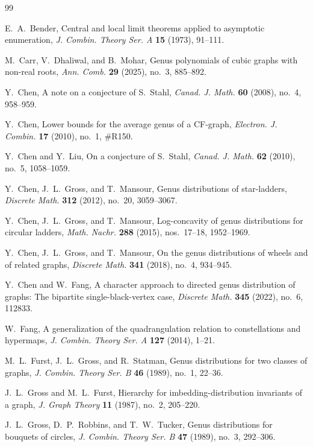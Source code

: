\documentclass[12pt]{article}
\theoremstyle{definition}
\begin{document}
\begin{thebibliography}{99}
\frenchspacing

E.~A.~Bender,
Central and local limit theorems applied to asymptotic enumeration,
\emph{J. Combin. Theory Ser. A} \textbf{15} (1973),  91--111.

M.~Carr, V.~Dhaliwal, and B.~Mohar,
Genus polynomials of cubic graphs with non-real roots,
\emph{Ann. Comb.} \textbf{29} (2025), no.~3, 885--892.

Y.~Chen,
A note on a conjecture of S.~Stahl,
\emph{Canad. J. Math.} \textbf{60} (2008), no.~4, 958--959.

Y.~Chen,
Lower bounds for the average genus of a CF-graph,
\emph{Electron. J. Combin.} \textbf{17} (2010), no.~1, \#R150.

Y.~Chen and Y.~Liu,
On a conjecture of S.~Stahl,
\emph{Canad. J. Math.} \textbf{62} (2010), no.~5, 1058--1059.

Y.~Chen, J.~L.~Gross, and T.~Mansour,
Genus distributions of star-ladders,
\emph{Discrete Math.} \textbf{312} (2012), no.~20, 3059--3067.

Y.~Chen, J.~L.~Gross, and T.~Mansour,
Log-concavity of genus distributions for circular ladders,
\emph{Math. Nachr.} \textbf{288} (2015), nos.~17--18, 1952--1969.

Y.~Chen, J.~L.~Gross, and T.~Mansour,
On the genus distributions of wheels and of related graphs,
\emph{Discrete Math.} \textbf{341} (2018), no.~4, 934--945.

Y.~Chen and W.~Fang,
A character approach to directed genus distribution of graphs: The bipartite single-black-vertex case,
\emph{Discrete Math.} \textbf{345} (2022), no.~6, 112833.

W.~Fang,
A generalization of the quadrangulation relation to constellations and hypermaps,
\emph{J. Combin. Theory Ser. A} \textbf{127} (2014), 1--21.

M.~L.~Furst, J.~L.~Gross, and R.~Statman,
Genus distributions for two classes of graphs,
\emph{J. Combin. Theory Ser. B} \textbf{46} (1989), no.~1, 22--36.

J.~L.~Gross and M.~L.~Furst,
Hierarchy for imbedding-distribution invariants of a graph,
\emph{J. Graph Theory} \textbf{11} (1987), no.~2, 205--220.

J.~L.~Gross, D.~P.~Robbins, and T.~W.~Tucker,
Genus distributions for bouquets of circles,
\emph{J. Combin. Theory Ser. B} \textbf{47} (1989), no.~3, 292--306.


\end{thebibliography}
\end{document}
